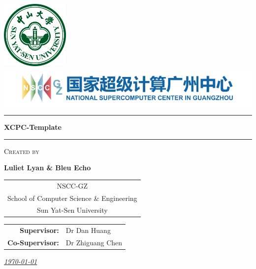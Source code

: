 \documentclass[8pt]{report}
\makeatletter
\newcommand{\studentname}{Luliet Lyan \& Bleu Echo}
\newcommand{\researchcentre}{NSCC-GZ}
\newcommand{\projecttitle}{XCPC-Template}
\newcommand{\supervisorA}{Dr Dan Huang}  %
\newcommand{\supervisorB}{Dr Zhiguang Chen}   %
\renewenvironment{titlepage}{%
  \cleardoublepage
  \if@twocolumn
    \@restonecoltrue\onecolumn
  \else
    \@restonecolfalse\newpage
  \fi
  \thispagestyle{empty}%
}{%
  \if@restonecol\twocolumn \else \newpage \fi
}
\makeatother
\begin{document}
\begin{titlepage}
    \centering
    
    \vspace{1cm}
	\includegraphics[width=0.25\textwidth]{figures/SYSU.pdf}
    \includegraphics[width=1.0\textwidth]{figures/NSCC-GZ.pdf}
    \vspace{1cm}

    \begin{minipage}{1.0\textwidth}
        \centering

		\rule{\textwidth}{3pt}
		\vspace{0.5cm}

        \fontsize{28}{30}\bfseries
        \projecttitle

		\vspace{0.5cm}
		\rule{\textwidth}{3pt}
    \end{minipage}

	\vspace{0.8cm}
    
	\setlength{\fboxrule}{2pt} %
	\setlength{\fboxsep}{1cm}  %
	\begin{minipage}{0.75\textwidth} %
		\centering
		\vspace{1.3cm}

		\fontsize{14}{16}\selectfont
		\textsc{Created by} %
		
		\vspace{0.8cm}
		\fontsize{20}{24}\selectfont
		\textbf{\studentname}
		
		\vspace{0.8cm}
		\fontsize{12}{14}\selectfont
		\begin{tabular}{c}
			\researchcentre \\
			School of Computer Science \& Engineering \\
			Sun Yat-Sen University
		\end{tabular}
	
		\vspace{0.8cm}
		
		\begin{tabular}{rl}
			\textbf{Supervisor:} & \supervisorA \\
			\textbf{Co-Supervisor:} & \supervisorB
		\end{tabular}

	\end{minipage}
    
    \vfill
    
    \underline{\textit{\today}}
\end{titlepage}
\end{document}
